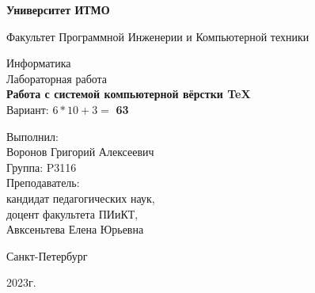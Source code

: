 \thispagestyle{empty}

\begin{center}
    \textbf{Университет ИТМО}

    \vspace{1em}
    Факультет Программной Инженерии и Компьютерной техники

    \vspace{15em}
    
    {\Large Информатика}\\[1em]
    {\Large Лабораторная работа }\\[1em]
    {\Large \textbf{Работа с системой компьютерной вёрстки \TeX}}\\[1em]
    Вариант: $6 * 10 + 3 =$ \textbf{63}
\end{center}

\vspace{6em}

\begin{flushright}
    Выполнил: \\
    Воронов Григорий Алексеевич\\
    Группа: P3116 \\
    Преподаватель: \\
    кандидат педагогических наук, \\
    доцент факультета ПИиКТ, \\
    Авксеньтева Елена Юрьевна \\
\end{flushright}
\vspace{10em}
\vspace{\fill}

\begin{center}
Санкт-Петербург

2023г.
\end{center}
